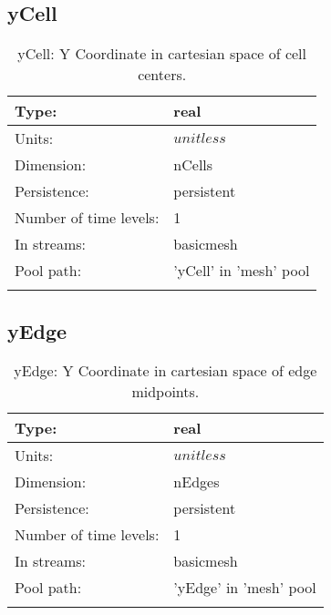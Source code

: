\subsection[yCell]{yCell}
\label{subsec:var_sec_mesh_yCell}
\begin{center}
\begin{longtable}{| p{2.0in} | p{4.0in} |}
        \hline 
        Type: & real \\
        \hline 
        Units: & $unitless$ \\
        \hline 
        Dimension: & nCells \\
        \hline 
        Persistence: & persistent \\
        \hline 
        Number of time levels: & 1 \\
        \hline 
		 In streams: &  basicmesh \\
        \hline 
            Pool path: & 'yCell' in 'mesh' pool
 \\
		 \hline 
    \caption{yCell: Y Coordinate in cartesian space of cell centers.}
\end{longtable}
\end{center}
\subsection[yEdge]{yEdge}
\label{subsec:var_sec_mesh_yEdge}
\begin{center}
\begin{longtable}{| p{2.0in} | p{4.0in} |}
        \hline 
        Type: & real \\
        \hline 
        Units: & $unitless$ \\
        \hline 
        Dimension: & nEdges \\
        \hline 
        Persistence: & persistent \\
        \hline 
        Number of time levels: & 1 \\
        \hline 
		 In streams: &  basicmesh \\
        \hline 
            Pool path: & 'yEdge' in 'mesh' pool
 \\
		 \hline 
    \caption{yEdge: Y Coordinate in cartesian space of edge midpoints.}
\end{longtable}
\end{center}
